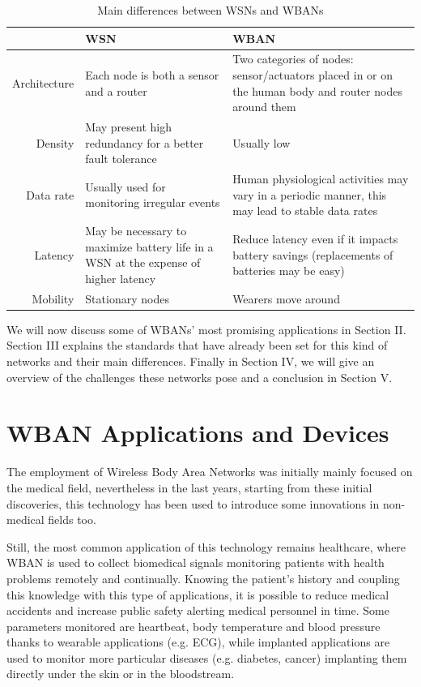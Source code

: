 \documentclass[conference]{IEEEtran}
\begin{document}
\begin{table}[htbp]
	\caption{Main differences between WSNs and WBANs}
	\begin{tabularx}{0.5\textwidth}{r|X|X|}
	 & \textbf{WSN} & \textbf{WBAN} \\
	\hline
	Architecture & Each node is both a sensor and a router & Two categories of nodes: sensor/actuators placed in or on the human body and router nodes around them \\
	\hline
	Density & May present high redundancy for a better fault tolerance & Usually low \\
	\hline
	Data rate & Usually used for monitoring irregular events & Human physiological activities may vary in a periodic manner, this may lead to stable data rates \\
	\hline
	Latency	& May be necessary to maximize battery life in a WSN at the expense of higher latency & Reduce latency even if it impacts battery savings (replacements of batteries may be easy) \\
	\hline
	Mobility & Stationary nodes & Wearers move around \\
	\hline
	\end{tabularx}
	\label{tab1}
	\end{table}

We will now discuss some of WBANs' most promising applications in Section II. Section III explains the standards that have already been set for this kind of networks and their main differences. Finally in Section IV, we will give an overview of the challenges these networks pose and a conclusion in Section V.


\section{WBAN Applications and Devices}
The employment of Wireless Body Area Networks was initially mainly focused on the medical field, nevertheless in the last years, starting from these initial discoveries, this technology has been used to introduce some innovations in non-medical fields too.

Still, the most common application of this technology remains healthcare, where WBAN is used to collect biomedical signals monitoring patients with health problems remotely and continually. 
Knowing the patient's history and coupling this knowledge with this type of applications, it is possible to reduce medical accidents and increase public safety alerting medical personnel in time. Some parameters monitored are heartbeat, body temperature and blood pressure thanks to wearable applications (e.g. ECG), while implanted applications are used to monitor more particular diseases (e.g. diabetes, cancer) implanting them directly under the skin or in the bloodstream.
\end{document}
